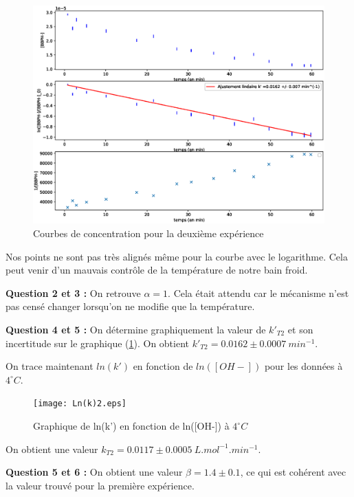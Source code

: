 \documentclass[12pt]{article}
\begin{document}
\begin{figure}[h!]
    \begin{center}
        \includegraphics[scale=0.55]{DeuxièmeCourbesCinétiques.eps}
        \caption{Courbes de concentration pour la deuxième expérience}
        \label{img4:deuxièmexp}
    \end{center}
\end{figure}
Nos points ne sont pas très alignés même pour la courbe avec le logarithme. 
Cela peut venir d'un mauvais contrôle de la température de notre bain froid.
\newpage

\textbf{Question 2 et 3 :} On retrouve $\alpha =1$. Cela était attendu car le mécanisme n'est pas censé changer lorsqu'on ne modifie que la température.

\textbf{Question 4 et 5 :} On détermine graphiquement la valeur de $k'_{T2}$ et son incertitude sur le graphique (\ref{img4:deuxièmexp}).
On obtient $k'_{T2}=0.0162 \pm 0.0007 \ min^{-1}$.

On trace maintenant $ln(k')$ en fonction de $ln([OH-])$ pour les données à $4^\circ C$.
\begin{figure}[h!]
    \begin{center}
        \texttt{[image: Ln(k)2.eps]}
        \caption{Graphique de ln(k') en fonction de ln([OH-]) à $4^\circ C$} 
        \label{im5:ln4 4 degré}
    \end{center}
\end{figure}

On obtient une valeur $k_{T2}=0.0117 \pm 0.0005 \ L.mol^{-1}.min^{-1}$.

\textbf{Question 5 et 6 :} On obtient une valeur $\beta = 1.4 \pm 0.1$, ce qui est cohérent avec la valeur trouvé pour la première expérience.
\end{document}
